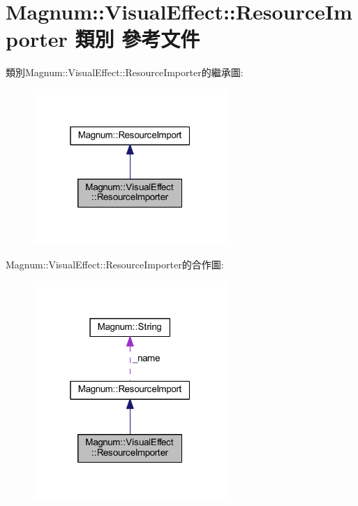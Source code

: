 \hypertarget{class_magnum_1_1_visual_effect_1_1_resource_importer}{}\section{Magnum\+:\+:Visual\+Effect\+:\+:Resource\+Importer 類別 參考文件}
\label{class_magnum_1_1_visual_effect_1_1_resource_importer}


類別\+Magnum\+:\+:Visual\+Effect\+:\+:Resource\+Importer的繼承圖\+:\nopagebreak
\begin{figure}[H]
\begin{center}
\leavevmode
\includegraphics[width=208pt]{class_magnum_1_1_visual_effect_1_1_resource_importer__inherit__graph}
\end{center}
\end{figure}


Magnum\+:\+:Visual\+Effect\+:\+:Resource\+Importer的合作圖\+:\nopagebreak
\begin{figure}[H]
\begin{center}
\leavevmode
\includegraphics[width=208pt]{class_magnum_1_1_visual_effect_1_1_resource_importer__coll__graph}
\end{center}
\end{figure}
